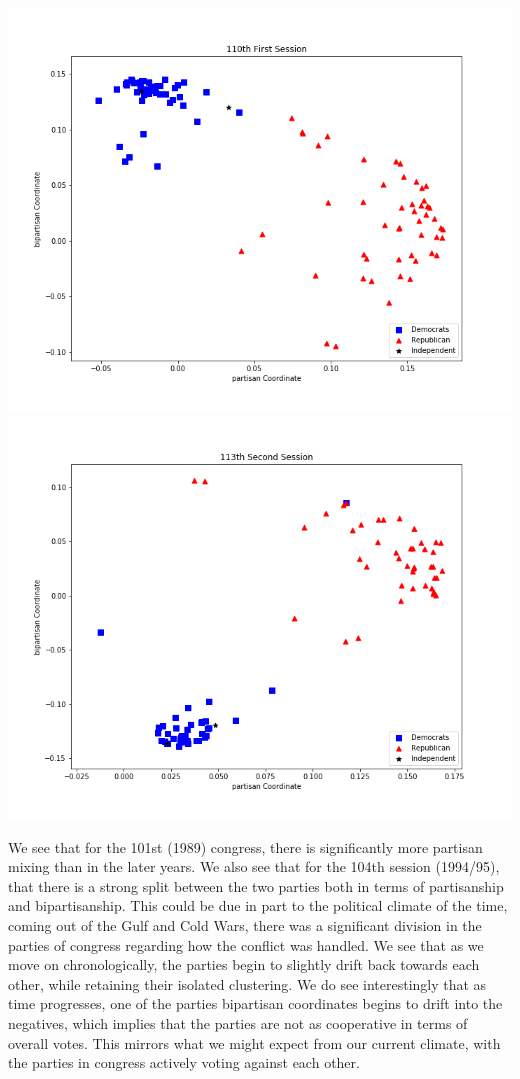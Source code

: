 \documentclass[letterpaper,12pt]{article}
\begin{document}
\begin{center}
\includegraphics[scale=.25]{110th1.png}
\includegraphics[scale=.25]{113th2.png}
\end{center}
We see that for the 101st (1989) congress, there is significantly more partisan mixing than in the later years. We also see that for the 104th session (1994/95), that there is a strong split between the two parties both in terms of partisanship and bipartisanship. This could be due in part to the political climate of the time, coming out of the Gulf and Cold Wars, there was a significant division in the parties of congress regarding how the conflict was handled. We see that as we move on chronologically, the parties begin to slightly drift back towards each other, while retaining their isolated clustering. We do see interestingly that as time progresses, one of the parties bipartisan coordinates begins to drift into the negatives, which implies that the parties are not as cooperative in terms of overall votes. This mirrors what we might expect from our current climate, with the parties in congress actively voting against each other.
\end{document}
